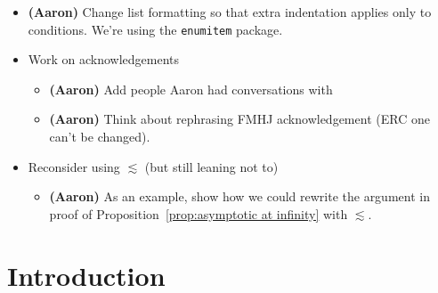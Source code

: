 \documentclass{article}
\theoremstyle{plain}
\newenvironment{brainstorm}{\color{violet}\begin{itemize}}{\end{itemize}\color{black}}
\begin{document}
\begin{brainstorm}
\begin{itemize}
\end{itemize}
\color{violet}
\item \textbf{(Aaron)} Change list formatting so that extra indentation applies only to conditions. We're using the \texttt{enumitem} package.
\item Work on acknowledgements
\begin{itemize}
\item \textbf{(Aaron)} Add people Aaron had conversations with
\item \textbf{(Aaron)} Think about rephrasing FMHJ acknowledgement (ERC one can't be changed).
\end{itemize}
\item Reconsider using $\lesssim$ (but still leaning not to)
\begin{itemize}
    \item \textbf{(Aaron)} As an example, show how we could rewrite the argument in proof of Proposition~\ref{prop:asymptotic at infinity} with $\lesssim$.
\end{itemize}
\end{brainstorm}
\section{Introduction}
\end{document}
